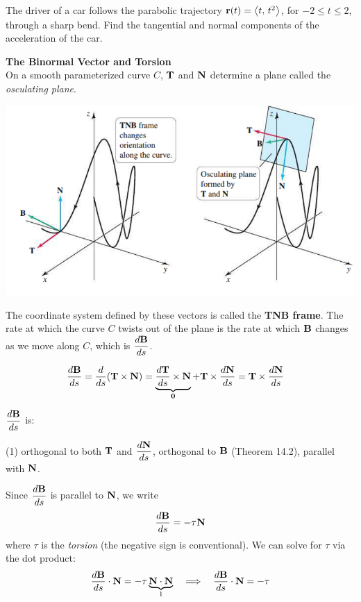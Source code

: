 \documentclass[../mathNotesPreamble]{subfiles}
\begin{document}
  \begin{ex*}
    The driver of a car follows the parabolic trajectory ${\mathbf{r}}(t)={\left\langle t,\,t^2 \right\rangle}$, for $-2\leq t\leq 2$, through a sharp bend. Find the tangential and normal components of the acceleration of the car.
  \end{ex*}
  \pagebreak

  \textbf{The Binormal Vector and Torsion}\\
  On a smooth parameterized curve $C$, ${\mathbf{T}}$ and ${\mathbf{N}}$ determine a plane called the \textit{osculating plane}. 
  
  \begin{center}
    \includegraphics[width=0.6\linewidth]{../images/briggs_14_05/fig14_37}
  \end{center}
  
  The coordinate system defined by these vectors is called the \textbf{TNB frame}. The rate at which the curve $C$ twists out of the plane is the rate at which ${\mathbf{B}}$ changes as we move along $C$, which is $\displaystyle\frac{d{\mathbf{B}}}{ds}$.

  \begin{align*}
    \frac{d{\mathbf{B}}}{ds}&= \frac{d}{ds}{\left({\mathbf{T}}\times{\mathbf{N}}\right)}
      =\underbrace{\frac{d{\mathbf{T}}}{ds}\times{\mathbf{N}}}_{\mathbf{0}}+{\mathbf{T}}\times \frac{d{\mathbf{N}}}{ds}
      ={\mathbf{T}}\times \frac{d{\mathbf{N}}}{ds}
  \end{align*}

  $\displaystyle\frac{d{\mathbf{B}}}{ds}$ is:
  \begin{tasks}[label=\textbullet](1)
    \task orthogonal to both ${\mathbf{T}}$ and $\displaystyle\frac{d{\mathbf{N}}}{ds}$,
    \task orthogonal to ${\mathbf{B}}$ (Theorem 14.2),
    \task parallel with ${\mathbf{N}}$.
  \end{tasks}
  \pagebreak

  Since $\displaystyle\frac{d{\mathbf{B}}}{ds}$ is parallel to ${\mathbf{N}}$, we write
    \[\frac{d{\mathbf{B}}}{ds}=-\tau{\mathbf{N}}\]
  where $\tau$ is the \textit{torsion} (the negative sign is conventional). We can solve for $\tau$ via the dot product:
  \begin{align*}
    \frac{d{\mathbf{B}}}{ds}\cdot{\mathbf{N}}=-\tau \underbrace{{\mathbf{N}}\cdot{\mathbf{N}}}_1 \quad\Longrightarrow\quad
    \frac{d{\mathbf{B}}}{ds}\cdot{\mathbf{N}}=-\tau
  \end{align*}
\end{document}
